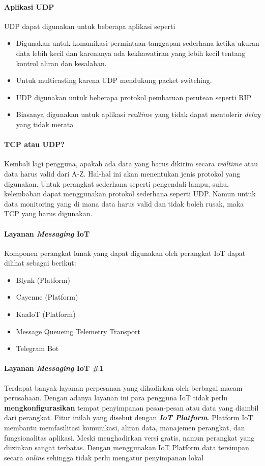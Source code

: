 \begin{frame}{\insertsectionhead}
	\framesubtitle{Aplikasi UDP}
	\justifying
	UDP dapat digunakan untuk beberapa aplikasi seperti
	\vfill
	\begin{itemize}
		\item Digunakan untuk komunikasi permintaan-tanggapan sederhana ketika ukuran data lebih kecil dan karenanya ada kekhawatiran yang lebih kecil tentang kontrol aliran dan kesalahan.
		\item Untuk multicasting karena UDP mendukung packet switching.
		\item UDP digunakan untuk beberapa protokol pembaruan perutean seperti RIP
		\item Biasanya digunakan untuk aplikasi \textit{realtime} yang tidak dapat mentolerir \textit{delay} yang tidak merata
	\end{itemize}
\end{frame}

\begin{frame}{\insertsectionhead}
	\framesubtitle{TCP atau UDP?}
	\justifying
	Kembali lagi pengguna, apakah ada data yang harus dikirim secara \textit{realtime} atau data harus valid dari A-Z. Hal-hal ini akan menentukan jenis protokol yang digunakan.
	\vfill
	Untuk perangkat sederhana seperti pengendali lampu, suhu, kelembaban dapat menggunakan protokol sederhana seperti UDP.
	\vfill
	Namun untuk data monitoring yang di mana data harus valid dan tidak boleh rusak, maka TCP yang harus digunakan.
\end{frame}

\begin{frame}{\insertsectionhead}
	\framesubtitle{Layanan \textit{Messaging} IoT}
	\justifying
	Komponen perangkat lunak yang dapat digunakan oleh perangkat IoT dapat dilihat sebagai berikut:
	\begin{itemize}
		\item Blynk (Platform)
		\item Cayenne (Platform)
		\item KaaIoT (Platform)
		\item Message Queueing Telemetry Transport
		\item Telegram Bot
	\end{itemize}
\end{frame}

\begin{frame}{\insertsectionhead}
	\framesubtitle{Layanan \textit{Messaging} IoT \#1}
	\justifying
	Terdapat banyak layanan perpesanan yang dihadirkan oleh berbagai macam perusahaan. Dengan adanya layanan ini para pengguna IoT tidak perlu \textbf{mengkonfigurasikan} tempat penyimpanan pesan-pesan atau data yang diambil dari perangkat.
	\vfill
	Fitur inilah yang disebut dengan \textbf{\textit{IoT Platform}}. Platform IoT membantu memfasilitasi komunikasi, aliran data, manajemen perangkat, dan fungsionalitas aplikasi.
	\vfill
	Meski menghadirkan versi gratis, namun perangkat yang diizinkan sangat terbatas. Dengan menggunakan IoT Platform data tersimpan secara \textit{online} sehingga tidak perlu mengatur penyimpanan lokal
\end{frame}

